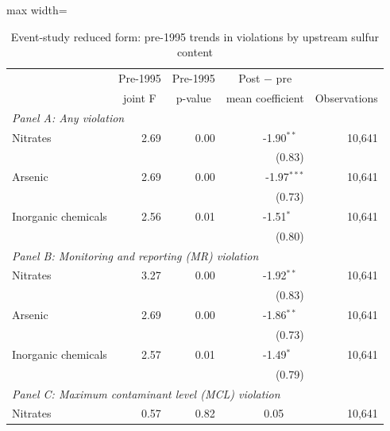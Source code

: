 \begin{table}[htbp]
\raggedright
\begin{minipage}{\linewidth}
\caption{\label{tab:es_rf_pretrend_vio_k2} Event-study reduced form: pre-1995 trends in violations by upstream sulfur content}
\end{minipage}
\small
{\setlength{\tabcolsep}{4pt}%
\begin{adjustbox}{max width=\linewidth}
\begin{tabular}{p{5cm}rrrr}
\toprule
 & \multicolumn{1}{c}{Pre-1995} & \multicolumn{1}{c}{Pre-1995} & \multicolumn{1}{c}{Post $-$ pre} & \\
 & \multicolumn{1}{c}{joint F} & \multicolumn{1}{c}{p-value} & \multicolumn{1}{c}{mean coefficient} & \multicolumn{1}{c}{Observations} \\
\hline
\multicolumn{5}{l}{\textit{Panel A: Any violation}} \\
\quad Nitrates & 2.69 & 0.00 & \phantom{(}-1.90$^{**\phantom{*}}$ & 10,641 \\
 & & & (\phantom{-}0.83)\phantom{$^{***}$} & \\
\quad Arsenic & 2.69 & 0.00 & \phantom{(}-1.97$^{***}$ & 10,641 \\
 & & & (\phantom{-}0.73)\phantom{$^{***}$} & \\
\quad Inorganic chemicals & 2.56 & 0.01 & \phantom{(}-1.51$^{*\phantom{*}\phantom{*}}$ & 10,641 \\
 & & & (\phantom{-}0.80)\phantom{$^{***}$} & \\
\hline
\multicolumn{5}{l}{\textit{Panel B: Monitoring and reporting (MR) violation}} \\
\quad Nitrates & 3.27 & 0.00 & \phantom{(}-1.92$^{**\phantom{*}}$ & 10,641 \\
 & & & (\phantom{-}0.83)\phantom{$^{***}$} & \\
\quad Arsenic & 2.69 & 0.00 & \phantom{(}-1.86$^{**\phantom{*}}$ & 10,641 \\
 & & & (\phantom{-}0.73)\phantom{$^{***}$} & \\
\quad Inorganic chemicals & 2.57 & 0.01 & \phantom{(}-1.49$^{*\phantom{*}\phantom{*}}$ & 10,641 \\
 & & & (\phantom{-}0.79)\phantom{$^{***}$} & \\
\hline
\multicolumn{5}{l}{\textit{Panel C: Maximum contaminant level (MCL) violation}} \\
\quad Nitrates & 0.57 & 0.82 & \phantom{(}\phantom{-}0.05$^{\phantom{*}\phantom{*}\phantom{*}}$ & 10,641 \\

\end{tabular}
\end{adjustbox}}
\end{table}
